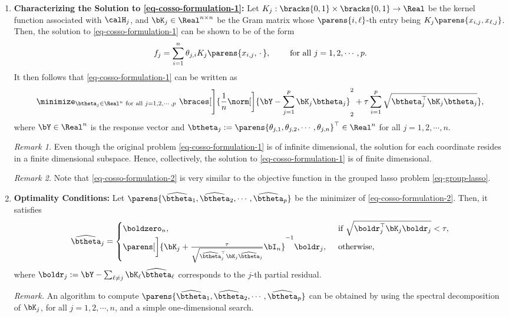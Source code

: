 \documentclass[12pt]{article}
\begin{document}
\begin{enumerate}[label=\textbf{\arabic*.}]
	\item \textbf{Characterizing the Solution to \eqref{eq-cosso-formulation-1}:} Let $K_j: \bracks{0, 1} \times \bracks{0, 1} \to \Real$ be the kernel function associated with $\calH_j$, and $\bK_j \in \Real^{n \times n}$ be the Gram matrix whose $\parens{i, \ell}$-th entry being $K_j \parens{x_{i,j}, x_{\ell,j}}$. Then, the solution to \eqref{eq-cosso-formulation-1} can be shown to be of the form 
	\begin{align*}
		f_j = \sum_{i=1}^n \theta_{j,i} K_{j} \parens{x_{i,j}, \,\cdot\,}, \qquad \text{ for all } j = 1, 2, \cdots, p. 
	\end{align*}
	It then follows that \eqref{eq-cosso-formulation-1} can be written as 
	\begin{align}\label{eq-cosso-formulation-2}
		\minimize_{\btheta_j \in \Real^n \text{ for all } j = 1, 2, \cdots, p} \ \braces[\Bigg]{\frac{1}{n} \norm[\bigg]{\bY - \sum_{j=1}^p \bK_j \btheta_j}_2^2 + \tau \sum_{i=1}^p \sqrt{\btheta_j^\top \bK_j \btheta_j} }, 
	\end{align}
	where $\bY \in \Real^n$ is the response vector and $\btheta_j := \parens{\theta_{j,1}, \theta_{j,2}, \cdots, \theta_{j,n}}^\top \in \Real^n$ for all $j = 1, 2, \cdots, n$. 
	
	\textit{Remark 1.} Even though the original problem \eqref{eq-cosso-formulation-1} is of infinite dimensional, the solution for each coordinate resides in a finite dimensional subspace. Hence, collectively, the solution to \eqref{eq-cosso-formulation-1} is of finite dimensional. 
	
	\textit{Remark 2.} Note that \eqref{eq-cosso-formulation-2} is very similar to the objective function in the grouped lasso problem \eqref{eq-group-lasso}. 
	
	\item \textbf{Optimality Conditions:} Let $\parens{\widehat{\btheta}_1, \widehat{\btheta}_2, \cdots, \widehat{\btheta}_p}$ be the minimizer of \eqref{eq-cosso-formulation-2}. Then, it satisfies 
	\begin{align*}
		\widehat{\btheta}_j = \begin{cases}
			\boldzero_{n}, & \, \text{ if } \sqrt{\boldr_j^\top \bK_j \boldr_j} < \tau, \\ 
			\parens[\bigg]{\bK_j + \frac{\tau}{\sqrt{\widehat{\btheta}_j^\top \bK_j \widehat{\btheta}_j}} \bI_n}^{-1} \boldr_j, & \, \text{ otherwise}, 
		\end{cases}
	\end{align*}
	where $\boldr_j := \bY - \sum_{\ell \neq j} \bK_{\ell} \widehat{\btheta}_{\ell}$ corresponds to the $j$-th partial residual. 
	
	\textit{Remark.} An algorithm to compute $\parens{\widehat{\btheta}_1, \widehat{\btheta}_2, \cdots, \widehat{\btheta}_p}$ can be obtained by using the spectral decomposition of $\bK_j$, for all $j = 1, 2, \cdots, n$, and a simple one-dimensional search. 
	
\end{enumerate}

\printbibliography
\end{document}
